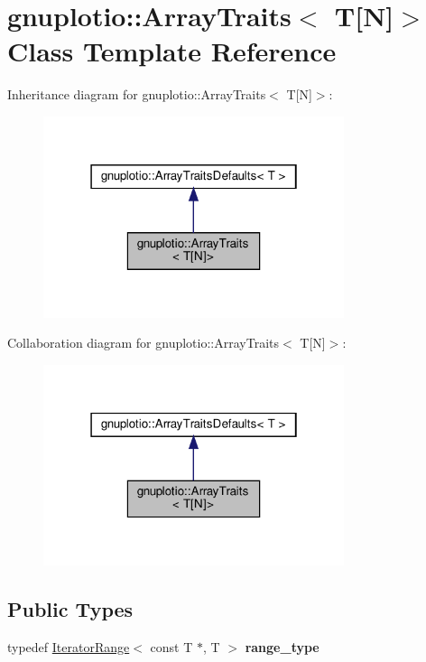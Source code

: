 \hypertarget{classgnuplotio_1_1ArrayTraits_3_01T[N]_4}{}\section{gnuplotio\+:\+:Array\+Traits$<$ T\mbox{[}N\mbox{]}$>$ Class Template Reference}
\label{classgnuplotio_1_1ArrayTraits_3_01T[N]_4}


Inheritance diagram for gnuplotio\+:\+:Array\+Traits$<$ T\mbox{[}N\mbox{]}$>$\+:\nopagebreak
\begin{figure}[H]
\begin{center}
\leavevmode
\includegraphics[width=250pt]{classgnuplotio_1_1ArrayTraits_3_01T[N]_4__inherit__graph}
\end{center}
\end{figure}


Collaboration diagram for gnuplotio\+:\+:Array\+Traits$<$ T\mbox{[}N\mbox{]}$>$\+:\nopagebreak
\begin{figure}[H]
\begin{center}
\leavevmode
\includegraphics[width=250pt]{classgnuplotio_1_1ArrayTraits_3_01T[N]_4__coll__graph}
\end{center}
\end{figure}
\subsection*{Public Types}
\begin{DoxyCompactItemize}
\item 
\mbox{\label{classgnuplotio_1_1ArrayTraits_3_01T[N]_4_a926f3c3d14fbe82aab7b70ccc16d20fb}} 
typedef \hyperlink{classgnuplotio_1_1IteratorRange}{Iterator\+Range}$<$ const T $\ast$, T $>$ {\bfseries range\+\_\+type}
\end{DoxyCompactItemize}
